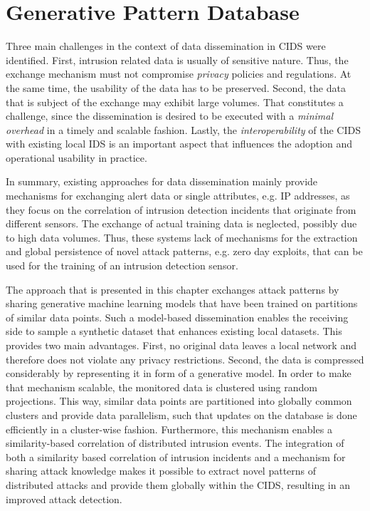 \chapter{Generative Pattern Database}

Three main challenges in the context of data dissemination in CIDS were identified. First, intrusion related data is usually of sensitive nature. Thus, the exchange mechanism must not compromise \textit{privacy} policies and regulations. At the same time, the usability of the data has to be preserved. Second, the data that is subject of the exchange may exhibit large volumes. That constitutes a challenge, since the dissemination is desired to be executed with a \textit{minimal overhead} in a timely and scalable fashion. Lastly, the \textit{interoperability} of the CIDS with existing local IDS is an important aspect that influences the adoption and operational usability in practice. 

In summary, existing approaches for data dissemination mainly provide mechanisms for exchanging alert data or single attributes, e.g. IP addresses, as they focus on the correlation of intrusion detection incidents that originate from different sensors. The exchange of actual training data is neglected, possibly due to high data volumes. Thus, these systems lack of mechanisms for the extraction and global persistence of novel attack patterns, e.g. zero day exploits, that can be used for the training of an intrusion detection sensor.

The approach that is presented in this chapter exchanges attack patterns by sharing generative machine learning models that have been trained on partitions of similar data points. Such a model-based dissemination enables the receiving side to sample a synthetic dataset that enhances existing local datasets. This provides two main advantages. First, no original data leaves a local network and therefore does not violate any privacy restrictions. Second, the data is compressed considerably by representing it in form of a generative model. In order to make that mechanism scalable, the monitored data is clustered using random projections. This way, similar data points are partitioned into globally common clusters and provide data parallelism, such that updates on the database is done efficiently in a cluster-wise fashion. Furthermore, this mechanism enables a similarity-based correlation of distributed intrusion events. The integration of both a similarity based correlation of intrusion incidents and a mechanism for sharing attack knowledge makes it possible to extract novel patterns of distributed attacks and provide them globally within the CIDS, resulting in an improved attack detection.


